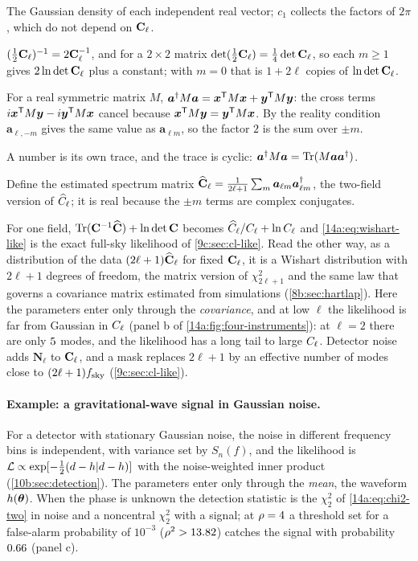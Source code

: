 \begin{explain}
  \item The Gaussian density of each independent real vector; $c_1$ collects the
        factors of $2\pi$, which do not depend on $\mathbf{C}_\ell$.
  \item $(\frac12\mathbf{C}_\ell)^{-1}=2\mathbf{C}_\ell^{-1}$, and for a $2\times2$ matrix
        $\det(\frac12\mathbf{C}_\ell)=\frac14\det\mathbf{C}_\ell$, so each $m\ge1$ gives
        $2\ln\det\mathbf{C}_\ell$ plus a constant; with $m=0$ that is $1+2\ell$ copies of
        $\ln\det\mathbf{C}_\ell$.
  \item For a real symmetric matrix $M$, $\bm a^\dagger M\bm a=\bm x^{\mathsf{T}} M\bm x+\bm y^{\mathsf{T}} M\bm y$:
        the cross terms $i\bm x^{\mathsf{T}} M\bm y-i\bm y^{\mathsf{T}} M\bm x$ cancel because
        $\bm x^{\mathsf{T}} M\bm y=\bm y^{\mathsf{T}} M\bm x$. By the reality condition $\bm a_{\ell,-m}$ gives
        the same value as $\bm a_{\ell m}$, so the factor $2$ is the sum over $\pm m$.
  \item A number is its own trace, and the trace is cyclic:
        $\bm a^\dagger M\bm a=\operatorname{Tr}(M\bm a\bm a^\dagger)$.
  \item Define the estimated spectrum matrix
        $\widehat{\mathbf{C}}_\ell=\frac1{2\ell+1}\sum_m\bm a_{\ell m}\bm a_{\ell m}^\dagger$, the
        two-field version of $\widehat{C}_\ell$; it is real because the $\pm m$ terms are complex
        conjugates.
\end{explain}
For one field, $\operatorname{Tr}(\mathbf{C}^{-1}\widehat{\mathbf{C}})+\ln\det\mathbf{C}$ becomes $\widehat{C}_\ell/C_\ell+\ln C_\ell$
and \eqref{14a:eq:wishart-like} is the exact full-sky likelihood of
\cref{9c:sec:cl-like}. Read the other way, as a distribution of the data
$(2\ell+1)\widehat{\mathbf{C}}_\ell$ for fixed $\mathbf{C}_\ell$, it is a Wishart distribution
with $2\ell+1$ degrees of freedom, the matrix version of $\chi^2_{2\ell+1}$ and the same
law that governs a covariance matrix estimated from simulations (\cref{8b:sec:hartlap}).
Here the parameters enter only through the \emph{covariance}, and at low $\ell$ the
likelihood is far from Gaussian in $C_\ell$ (panel b of
\cref{14a:fig:four-instruments}): at $\ell=2$ there are only $5$ modes, and
the likelihood has a long tail to large $C_\ell$. Detector noise adds $\bm N_\ell$ to
$\mathbf{C}_\ell$, and a mask replaces $2\ell+1$ by an effective number of modes close to
$(2\ell+1)f_{\mathrm{sky}}$ (\cref{9c:sec:cl-like}).

\paragraph{Example: a gravitational-wave signal in Gaussian noise.}
For a detector with stationary Gaussian noise, the noise in different frequency bins is
independent, with variance set by $S_n(f)$, and the likelihood is
$\mathcal{L}\propto\exp[-\frac12(d-h|d-h)]$ with the noise-weighted inner product
(\cref{10b:sec:detection}). The parameters enter only through the \emph{mean}, the
waveform $h(\bm{\theta})$. When the phase is unknown the detection statistic is the
$\chi^2_2$ of \eqref{14a:eq:chi2-two} in noise and a noncentral $\chi^2_2$ with a
signal; at $\rho=4$ a threshold set for a false-alarm probability of $10^{-3}$
($\rho^2>13.82$) catches the signal with probability $0.66$ (panel c).

